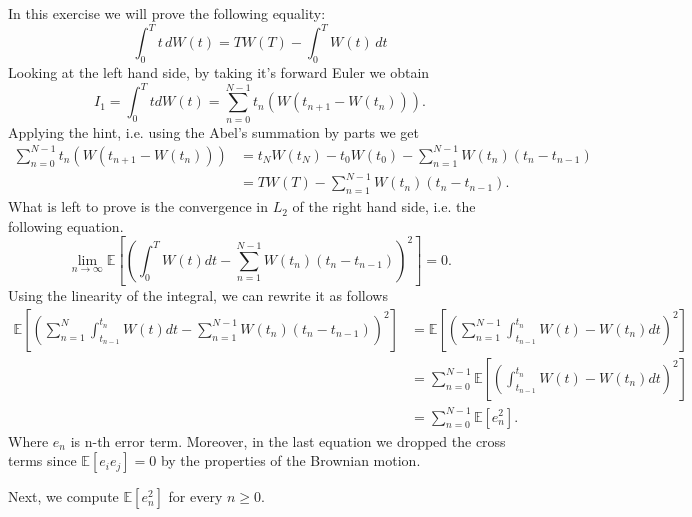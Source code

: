 \documentclass[a4paper,12pt]{article} %
\begin{document}
\subsection{}
In this exercise we will prove the following equality:
\begin{equation}
    \int_0^T t \, dW(t) = T W(T) - \int_0^T W(t) \, dt
\end{equation}
Looking at the left hand side, by taking it's forward Euler we obtain
\begin{equation}
    I_1 = \int _0^T t dW(t) = \sum_{n=0}^{N-1} t_n (W(t_{n+1} -W(t_n) )).
\end{equation}
Applying the hint, i.e. using the Abel's summation by parts we get
\begin{align*}
    \sum_{n=0}^{N-1} t_n (W(t_{n+1} -W(t_n) )) & = t_N W(t_N) - t_0 W(t_0) - \sum_{n=1}^{N-1} W(t_n) (t_n - t_{n-1}) \\
                                               & = T W(T)  - \sum_{n=1}^{N-1} W(t_n) (t_n - t_{n-1}).
\end{align*}
What is left to prove is the convergence in \(L_2\) of the right hand side, i.e. the following equation.
\begin{equation}
    \lim_{n \to \infty} \mathbb{E} \left[ \left(   \int _0^T W(t)dt-\sum_{n=1}^{N-1} W(t_n) (t_n - t_{n-1})  \right)^2\right] =0.
\end{equation}
Using the linearity of the integral, we can rewrite it as follows
\begin{align*}
    \mathbb{E} \left[ \left( \sum_{n=1}^{N}  \int _{t_{n-1}}^{t_n} W(t)dt-\sum_{n=1}^{N-1} W(t_n) (t_n - t_{n-1}) \right) ^2  \right] & = \mathbb{E} \left[ \left(   \sum_{n=1}^{N-1}  \int _{t_{n-1}}^{t_n} W(t)-W(t_n)dt  \right)^2 \right] \\
                                                                                                                                      & =\sum_{n=0}^{N-1} \mathbb{E} \left[ \left(     \int _{t_{n-1}}^{t_n} W(t)-W(t_n) dt \right)^2\right]  \\
                                                                                                                                      & = \sum_{n=0}^{N-1} \mathbb{E} \left[  e_n ^2 \right].
\end{align*}
Where \(e_n\) is n-th error term. Moreover, in the last equation we dropped the cross terms  since \(\mathbb{E} \left[ e_i e_j \right] = 0 \) by the properties of the Brownian motion.

Next, we compute \(\mathbb{E} \left[ e_n^2 \right]\) for every \(n \geq 0\).
\end{document}
